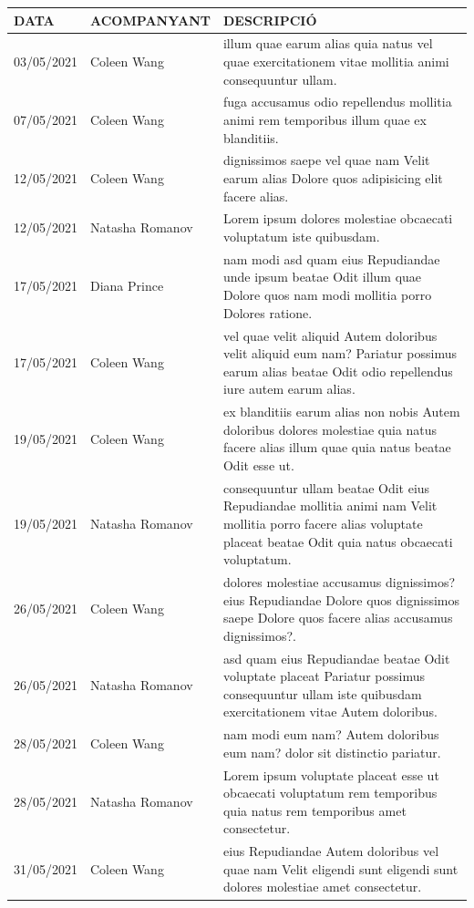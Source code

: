 \documentclass[a4paper,12pt]{elsarticle}  %
\begin{document}
	\begin{longtable}{p{}lp{}}
		

		
		\hline
		\textbf{DATA} & \textbf{ACOMPANYANT} & \textbf{DESCRIPCIÓ}\\
		\hline
			 03/05/2021 & Coleen Wang & illum quae earum alias quia natus vel quae exercitationem vitae mollitia animi consequuntur ullam. \\ 
			 07/05/2021 & Coleen Wang & fuga accusamus odio repellendus mollitia animi rem temporibus illum quae ex blanditiis. \\ 
			 12/05/2021 & Coleen Wang & dignissimos saepe vel quae nam Velit earum alias Dolore quos adipisicing elit facere alias. \\ 
			 12/05/2021 & Natasha Romanov & Lorem ipsum dolores molestiae obcaecati voluptatum iste quibusdam. \\ 
			 17/05/2021 & Diana Prince & nam modi asd quam eius Repudiandae unde ipsum beatae Odit illum quae Dolore quos nam modi mollitia porro Dolores ratione. \\ 
			 17/05/2021 & Coleen Wang & vel quae velit aliquid Autem doloribus velit aliquid eum nam? Pariatur possimus earum alias beatae Odit odio repellendus iure autem earum alias. \\ 
			 19/05/2021 & Coleen Wang & ex blanditiis earum alias non nobis Autem doloribus dolores molestiae quia natus facere alias illum quae quia natus beatae Odit esse ut. \\ 
			 19/05/2021 & Natasha Romanov & consequuntur ullam beatae Odit eius Repudiandae mollitia animi nam Velit mollitia porro facere alias voluptate placeat beatae Odit quia natus obcaecati voluptatum. \\ 
			 26/05/2021 & Coleen Wang & dolores molestiae accusamus dignissimos? eius Repudiandae Dolore quos dignissimos saepe Dolore quos facere alias accusamus dignissimos?. \\ 
			 26/05/2021 & Natasha Romanov & asd quam eius Repudiandae beatae Odit voluptate placeat Pariatur possimus consequuntur ullam iste quibusdam exercitationem vitae Autem doloribus. \\ 
			 28/05/2021 & Coleen Wang & nam modi eum nam? Autem doloribus eum nam? dolor sit distinctio pariatur. \\ 
			 28/05/2021 & Natasha Romanov & Lorem ipsum voluptate placeat esse ut obcaecati voluptatum rem temporibus quia natus rem temporibus amet consectetur. \\ 
			 31/05/2021 & Coleen Wang & eius Repudiandae Autem doloribus vel quae nam Velit eligendi sunt eligendi sunt dolores molestiae amet consectetur. \\ 
		
	\end{longtable}
\end{document}
